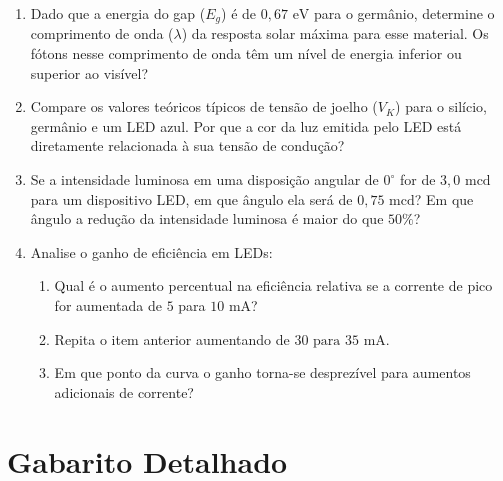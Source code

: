\documentclass[a4paper,12pt]{article}
\begin{document}
\begin{enumerate}[label=\textbf{Questão \arabic*:}]

    \item Dado que a energia do gap ($E_g$) é de $0,67\text{ eV}$ para o germânio, determine o comprimento de onda ($\lambda$) da resposta solar máxima para esse material. Os fótons nesse comprimento de onda têm um nível de energia inferior ou superior ao visível?

    \item Compare os valores teóricos típicos de tensão de joelho ($V_K$) para o silício, germânio e um LED azul. Por que a cor da luz emitida pelo LED está diretamente relacionada à sua tensão de condução?

    \item Se a intensidade luminosa em uma disposição angular de $0^\circ$ for de $3,0\text{ mcd}$ para um dispositivo LED, em que ângulo ela será de $0,75\text{ mcd}$? Em que ângulo a redução da intensidade luminosa é maior do que $50\%$?

    \item Analise o ganho de eficiência em LEDs:
    \begin{enumerate}[label=\alph*)]
        \item Qual é o aumento percentual na eficiência relativa se a corrente de pico for aumentada de $5$ para $10\text{ mA}$?
        \item Repita o item anterior aumentando de $30\text{ para } 35\text{ mA}$.
        \item Em que ponto da curva o ganho torna-se desprezível para aumentos adicionais de corrente?
    \end{enumerate}

\end{enumerate}

\newpage
\section*{Gabarito Detalhado}
\end{document}
